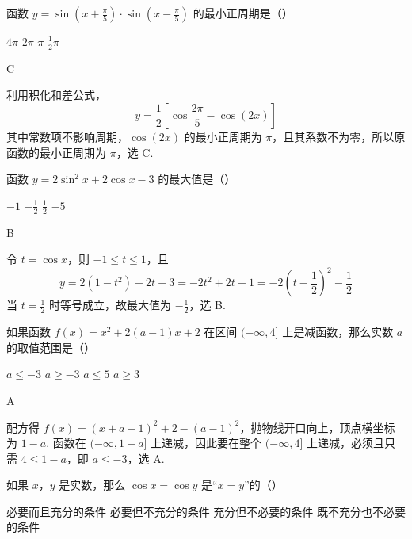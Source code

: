 \documentclass[UTF8,a4paper,oneside,11pt]{ctexbook}
\begin{document}
\begin{problem}
函数 \(y=\sin\left(x+\frac{\pi}{5}\right)\cdot\sin\left(x-\frac{\pi}{5}\right)\) 的最小正周期是（\quad）

\choices
    {\(4\pi\)}
    {\(2\pi\)}
    {\(\pi\)}
    {\(\frac{1}{2}\pi\)}
\end{problem}

\begin{answer}
C
\end{answer}

\begin{solution}
利用积化和差公式，
\[
y=\frac12\left[\cos\frac{2\pi}{5}-\cos(2x)\right]
\]
其中常数项不影响周期，\(\cos(2x)\) 的最小正周期为 \(\pi\)，且其系数不为零，所以原函数的最小正周期为 \(\pi\)，选 C.
\end{solution}

\begin{problem}
函数 \(y=2\sin^2 x+2\cos x-3\) 的最大值是（\quad）

\choices
    {\(-1\)}
    {\(-\frac{1}{2}\)}
    {\(\frac{1}{2}\)}
    {\(-5\)}
\end{problem}

\begin{answer}
B
\end{answer}

\begin{solution}
令 \(t=\cos x\)，则 \(-1\leqslant t\leqslant1\)，且
\[
y=2(1-t^2)+2t-3=-2t^2+2t-1=-2\left(t-\frac12\right)^2-\frac12
\]
当 \(t=\frac12\) 时等号成立，故最大值为 \(-\frac12\)，选 B.
\end{solution}

\begin{problem}
如果函数 \(f(x)=x^2+2(a-1)x+2\) 在区间 \((-\infty,4]\) 上是减函数，那么实数 \(a\) 的取值范围是（\quad）

\choices
    {\(a\leqslant -3\)}
    {\(a\geqslant -3\)}
    {\(a\leqslant 5\)}
    {\(a\geqslant 3\)}
\end{problem}

\begin{answer}
A
\end{answer}

\begin{solution}
配方得 \(f(x)=(x+a-1)^2+2-(a-1)^2\)，抛物线开口向上，顶点横坐标为 \(1-a\). 函数在 \((-\infty,1-a]\) 上递减，因此要在整个 \((-\infty,4]\) 上递减，必须且只需 \(4\leqslant1-a\)，即 \(a\leqslant-3\)，选 A.
\end{solution}

\begin{problem}
如果 \(x\)，\(y\) 是实数，那么 \(\cos x=\cos y\) 是“\(x=y\)”的（\quad）

\choices
    {必要而且充分的条件}
    {必要但不充分的条件}
    {充分但不必要的条件}
    {既不充分也不必要的条件}
\end{problem}
\end{document}
